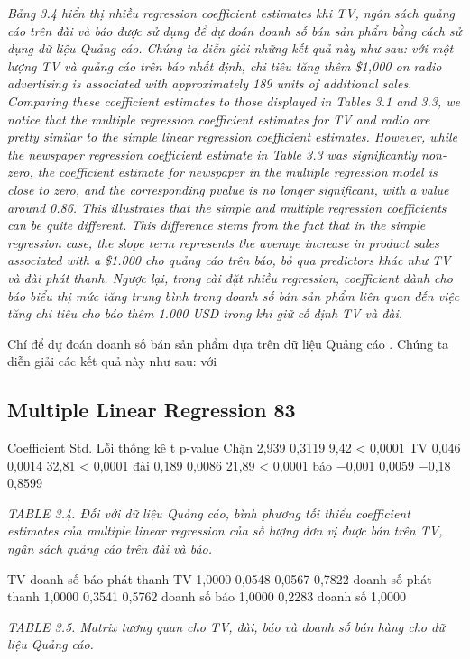 \noindent\textit{Bảng 3.4 hiển thị nhiều regression coefficient estimates khi TV, ngân sách quảng cáo trên đài và báo được sử dụng để dự đoán doanh số bán sản phẩm bằng cách sử dụng dữ liệu Quảng cáo. Chúng ta diễn giải những kết quả này như sau: với một lượng TV và quảng cáo trên báo nhất định, chi tiêu tăng thêm \$1,000 on radio advertising is associated with approximately 189 units of additional sales. Comparing these coefficient estimates to those displayed in Tables 3.1 and 3.3, we notice that the multiple regression coefficient estimates for TV and radio are pretty similar to the simple linear regression coefficient estimates. However, while the newspaper regression coefficient estimate in Table 3.3 was significantly non-zero, the coefficient estimate for newspaper in the multiple regression model is close to zero, and the corresponding pvalue is no longer significant, with a value around 0.86. This illustrates that the simple and multiple regression coefficients can be quite different. This difference stems from the fact that in the simple regression case, the slope term represents the average increase in product sales associated with a \$1.000 cho quảng cáo trên báo, bỏ qua predictors khác như TV và đài phát thanh. Ngược lại, trong cài đặt nhiều regression, coefficient dành cho báo biểu thị mức tăng trung bình trong doanh số bán sản phẩm liên quan đến việc tăng chi tiêu cho báo thêm 1.000 USD trong khi giữ cố định TV và đài.}

Chí để dự đoán doanh số bán sản phẩm dựa trên dữ liệu Quảng cáo . Chúng ta diễn giải các kết quả này như sau: với

\subsection{Multiple Linear Regression 83}

Coefficient Std. Lỗi thống kê t p-value Chặn 2,939 0,3119 9,42 < 0,0001 TV 0,046 0,0014 32,81 < 0,0001 đài 0,189 0,0086 21,89 < 0,0001 báo −0,001 0,0059 −0,18 0,8599

\noindent\textit{TABLE 3.4. Đối với dữ liệu Quảng cáo, bình phương tối thiểu coefficient estimates của multiple linear regression của số lượng đơn vị được bán trên TV, ngân sách quảng cáo trên đài và báo.}

TV doanh số báo phát thanh TV 1,0000 0,0548 0,0567 0,7822 doanh số phát thanh 1,0000 0,3541 0,5762 doanh số báo 1,0000 0,2283 doanh số 1,0000

\noindent\textit{TABLE 3.5. Matrix tương quan cho TV, đài, báo và doanh số bán hàng cho dữ liệu Quảng cáo.}

